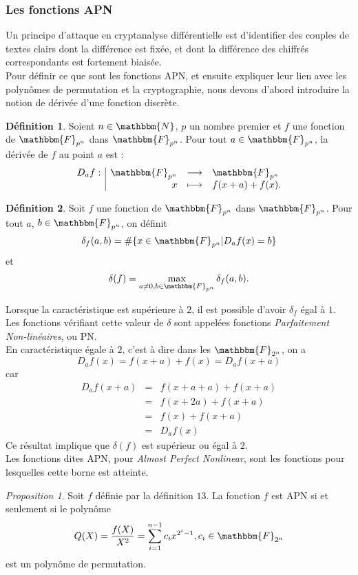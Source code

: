 \documentclass[12pt]{article}
\newcommand{\fonction}[5]{
\begin{displaymath}
\begin{array}{l|rcl}
\displaystyle
#1 : & #2 & \longrightarrow & #3 \\
    & #4 & \longmapsto & #5
\end{array}
\end{displaymath}
}
\theoremstyle{remark}\newtheorem{note}{Note}
\theoremstyle{remark}\newtheorem{nota}{Notation}
\newcommand{\F}{\mathbbm{F}}
\newtheorem{prop}{Proposition}
\theoremstyle{definition}
\newtheorem{definition}{Définition}
\begin{document}
\subsubsection{Les fonctions APN}
Un principe d'attaque en cryptanalyse différentielle est d'identifier des couples de textes clairs dont la différence est fixée, et dont la différence des chiffrés correspondants est fortement biaisée.\\
Pour définir ce que sont les fonctions APN, et ensuite expliquer leur lien avec les polynômes de permutation et la cryptographie, nous devons d'abord introduire la notion de dérivée d'une fonction discrète.

\begin{definition}
Soient $n \in \mathbbm{N}$, $p$ un nombre premier et $f$ une fonction de $\mathbbm{F}_{p^n}$ dans $\mathbbm{F}_{p^n}$. Pour tout $a \in \mathbbm{F}_{p^n}$, la dérivée de $f$ au point $a$ est : \fonction{D_af}{\F_{p^n}}{\F_{p^n}}{x}{f(x+a)+f(x).}
\end{definition}

\begin{definition}
Soit $f$ une fonction de $\mathbbm{F}_{p^n}$ dans $\mathbbm{F}_{p^n}$. Pour tout $a$, $b \in \mathbbm{F}_{p^n}$, on définit 
$$\delta_f(a,b)=\# \lbrace x\in \mathbbm{F}_{p^n}|D_af(x)=b\rbrace$$
et
$$\delta(f)=\max_{a\neq 0,b\in \mathbbm{F}_{p^n}} \delta_f(a,b).$$
\end{definition}

Lorsque la caractéristique est supérieure à $2$, il est possible d'avoir $\delta_f$ égal à $1$. Les fonctions vérifiant cette valeur de $\delta$ sont appelées fonctions \textit{Parfaitement Non-linéaires}, ou \textsf{PN}.\\
En caractéristique égale à $2$, c'est à dire dans les $\F_{2^n}$, on a 
$$D_af(x)=f(x+a)+f(x)=D_af(x+a)$$
car 
\begin{eqnarray}
\nonumber
D_af(x+a) &=& f(x+a+a)+f(x+a) \\ \nonumber
&=& f(x+2a)+f(x+a)  \\ \nonumber
&=& f(x)+f(x+a)\\ \nonumber
&=& D_af(x) \nonumber
\end{eqnarray}
Ce résultat implique que $\delta(f)$ est supérieur ou égal à $2$.\\
Les fonctions dites \textsf{APN}, pour \textit{Almost Perfect Nonlinear}, sont les fonctions pour lesquelles cette borne est atteinte.

\begin{prop}
Soit $f$ définie par la définition $13$. La fonction $f$ est APN si et seulement si le polynôme
$$Q(X)=\frac{f(X)}{X^2}= \displaystyle\sum_{i=1}^{n-1} c_i x^{2^i-1}, c_i \in \F_{2^n}$$
est un polynôme de permutation.
\end{prop}
\end{document}
